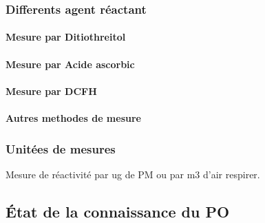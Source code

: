 \subsubsection{Differents agent réactant}%
\label{ssub:differents_agent_reactant}

\paragraph{Mesure par Ditiothreitol}%
\label{ssub:mesure_par_ditiothreitol}

\paragraph{Mesure par Acide ascorbic}%
\label{ssub:mesure_par_acide_ascorbic}

\paragraph{Mesure par DCFH}%
\label{ssub:mesure_par_dcfh}

\paragraph{Autres methodes de mesure}%
\label{sub:autres_methodes_de_mesure}

\subsubsection{Unitées de mesures}%
\label{ssub:unitees_de_mesures}

Mesure de réactivité par ug de PM ou par m3 d'air respirer.

\subsection{État de la connaissance du PO}%
\label{sub:etat_de_la_connaissance_du_po}



\printbibliography[segment=2,heading=subbibliography]
